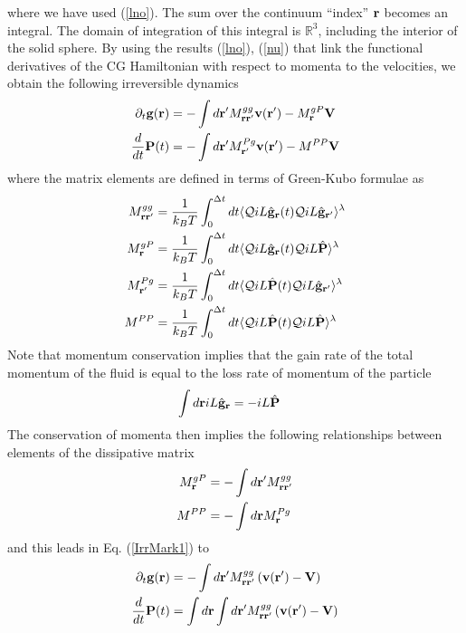 \documentclass[b5paper,openright,11pt]{book}
\begin{document}
where we have  used (\ref{lno}). The sum over  the continuum ``index''
${\bf  r}$ becomes  an integral.   The domain  of integration  of this
integral  is  $\mathbb{R}^3$,  including  the interior  of  the  solid
sphere. By  using the  results (\ref{lno}),  (\ref{nu}) that  link the
functional derivatives of  the CG Hamiltonian with  respect to momenta
to the velocities, we obtain the following irreversible dynamics
\begin{align}
  \partial_t{\bf g}({\bf r})&=-\int d{\bf r}'M^{gg}_{{\bf r}{\bf r}'}
{\bf v}({\bf r}')-M^{gP}_{\bf r}{\bf V}
\nonumber\\
\frac{d}{dt}{\bf P}(t)&=-\int d{\bf r}' M^{Pg}_{{\bf r}'}{\bf v}({\bf r}')-M^{PP}{\bf V}
\label{IrrMark1}\end{align}
where the matrix elements are  defined in terms of Green-Kubo formulae
as
\begin{align}
  M^{gg}_{{\bf r}{\bf r}'}&=\frac{1}{k_BT}\int_0^{\Delta t} dt\langle 
{\cal Q}  iL\hat{\bf g}_{{\bf r}}(t){\cal Q}  iL\hat{\bf g}_{{\bf r}'}\rangle^\lambda
\nonumber\\
  M^{gP}_{{\bf r}}&=\frac{1}{k_BT}\int_0^{\Delta t} dt\langle 
{\cal Q}  iL\hat{\bf g}_{\bf r}(t){\cal Q}  iL\hat{\bf P}\rangle^\lambda
\nonumber\\
  M^{Pg}_{{\bf r}'}&=\frac{1}{k_BT}\int_0^{\Delta t} dt\langle 
{\cal Q}  iL\hat{\bf P}(t){\cal Q}  iL\hat{\bf g}_{{\bf r}'}\rangle^\lambda
\nonumber\\
  M^{PP}&=\frac{1}{k_BT}\int_0^{\Delta t} dt\langle 
{\cal Q}  iL\hat{\bf P}(t){\cal Q}  iL\hat{\bf P}\rangle^\lambda
\nonumber\\
\label{Ms}
\end{align}
Note that momentum conservation implies that the gain rate of the total momentum
of the fluid is equal to the loss rate of momentum of the particle
\begin{align}
  \int d{\bf r} iL\hat{\bf g}_{\bf r}&=-iL\hat{\bf P}
\label{iLgiLP}
\end{align}
The conservation of momenta then implies the following relationships between
elements of the dissipative matrix
\begin{align}
M^{gP}_{{\bf r}}&=-\int d{\bf r}'M^{gg}_{{\bf r}{\bf r}'}
\nonumber\\
M^{PP}&= - \int d{\bf r}M^{Pg}_{{\bf r}}
\end{align}
and this leads in Eq. (\ref{IrrMark1}) to 
\begin{align}
  \partial_t{\bf g}({\bf r})&=-\int d{\bf r}'M^{gg}_{{\bf r}{\bf r}'}\left({\bf v}({\bf r}')-{\bf V}\right)
\nonumber\\
\frac{d}{dt}{\bf P}(t)&=\int d{\bf r}\int d{\bf r}'M^{gg}_{{\bf r}{\bf r}'}\left({\bf v}({\bf r}')-{\bf V}\right)
\label{IrrMark2}\end{align}
\end{document}
